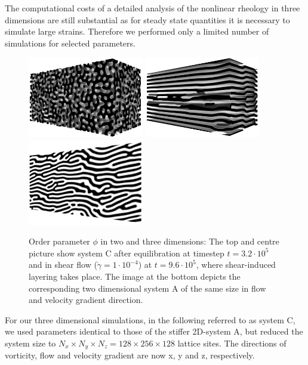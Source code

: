 \documentclass[8.5pt,twoside,twocolumn]{article}
\newcommand{\e}[1]{\cdot10^{#1}}
\begin{document}
The computational costs of a detailed analysis of the nonlinear rheology in three dimensions are still substantial as for steady state quantities it is necessary to simulate large strains.
Therefore we performed only a limited number of simulations for selected parameters. 
\begin{figure}[!]
\centering
\includegraphics[angle=0,width=0.45\textwidth]{phi_run786_320.jpg}
\includegraphics[angle=0,width=0.45\textwidth]{phi_run788_960.jpg}
\includegraphics[angle=0,width=0.45\textwidth]{phi_run792_960.jpg}
\caption{Order parameter $\phi$ in two and three dimensions: The top and centre picture show system C after equilibration at timestep $t=3.2\e{5}$ and in shear flow ($\dot{\gamma}=1\cdot10^{-4}$) at $t=9.6\e{5}$, where shear-induced layering takes place. The image at the bottom depicts the corresponding two dimensional system A of the same size in flow and velocity gradient direction.} 
\label{fig12}
\end{figure}
For our three dimensional simulations, in the following referred to as system C, we used parameters identical to those of the stiffer 2D-system A, but reduced the system size to $N_x\times N_y \times N_z=128\times256\times128$ lattice sites.
The directions of vorticity, flow and velocity gradient are now x, y and z, respectively.\\ 
\end{document}
